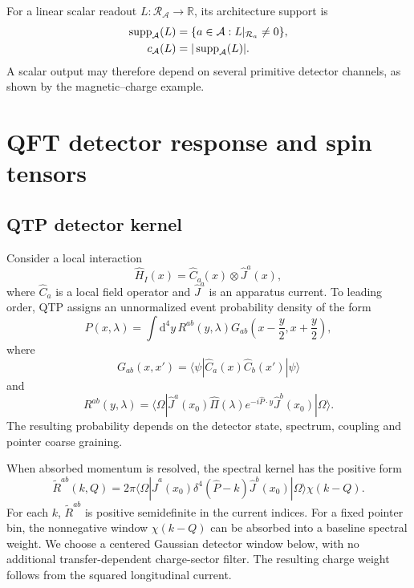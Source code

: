 \documentclass[12pt]{iopjournal}
\newcommand{\dd}{\mathrm d}
\theoremstyle{definition}
\theoremstyle{remark}
\begin{document}
For a linear scalar readout $L:\mathcal R_{\mathcal A}\to\mathbb R$, its architecture support is
\begin{align}
\operatorname{supp}_{\mathcal A}(L)
&=\{a\in\mathcal A:L|_{\mathcal R_a}\ne0\},
\notag\\
c_{\mathcal A}(L)
&=|\operatorname{supp}_{\mathcal A}(L)|.
\label{eq:readout-support}
\end{align}
A scalar output may therefore depend on several primitive detector channels, as shown by the magnetic--charge example.

\section{QFT detector response and spin tensors}
\label{sec:qtp}

\subsection{QTP detector kernel}

Consider a local interaction
\begin{equation}
\hat H_I(x)=\hat C_a(x)\otimes\hat J^a(x),
\end{equation}
where $\hat C_a$ is a local field operator and $\hat J^a$ is an apparatus current. To leading order, QTP assigns an unnormalized event probability density of the form \cite{AnastopoulosSavvidou2015I,AnastopoulosSavvidou2015II,AnastopoulosSavvidou2022,KoliopoulouAnastopoulosSavvidou2026}
\begin{equation}
P(x,\lambda)=\int\dd^4y\,R^{ab}(y,\lambda)
G_{ab}\!\left(x-\frac y2,x+\frac y2\right),
\label{eq:qtp-probability}
\end{equation}
where
\begin{equation}
G_{ab}(x,x')=\langle\psi|\hat C_a(x)\hat C_b(x')|\psi\rangle
\end{equation}
and
\begin{equation}
R^{ab}(y,\lambda)=
\langle\Omega|\hat J^a(x_0)\hat\Pi(\lambda)
 e^{-i\hat P\cdot y}\hat J^b(x_0)|\Omega\rangle.
\label{eq:detector-kernel}
\end{equation}
The resulting probability depends on the detector state, spectrum, coupling and pointer coarse graining.

When absorbed momentum is resolved, the spectral kernel has the positive form
\begin{equation}
\widetilde R^{ab}(k,Q)=2\pi
\langle\Omega|\hat J^a(x_0)\delta^4(\hat P-k)
\hat J^b(x_0)|\Omega\rangle\chi(k-Q).
\label{eq:spectral-kernel}
\end{equation}
For each $k$, $\widetilde R^{ab}$ is positive semidefinite in the current indices.
For a fixed pointer bin, the nonnegative window $\chi(k-Q)$ can be absorbed into a baseline spectral weight. We choose a centered Gaussian detector window below, with no additional transfer-dependent charge-sector filter. The resulting charge weight follows from the squared longitudinal current.
\end{document}
